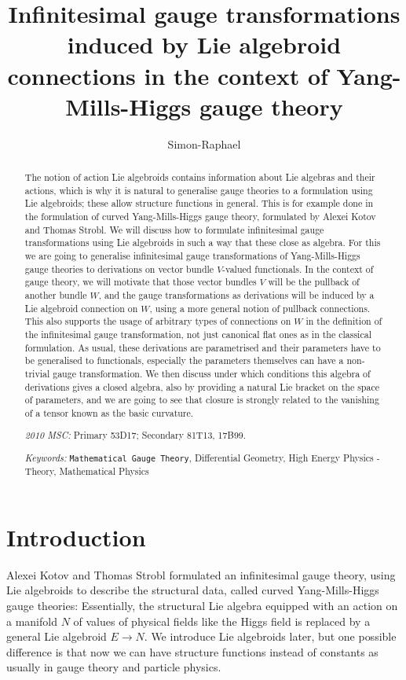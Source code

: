 \documentclass[CM,GP]{degruyter-crelle}       %
\title[Infinitesimal gauge transformations induced by Lie algebroid connections]{Infinitesimal gauge transformations induced by Lie algebroid connections in the context of Yang-Mills-Higgs gauge theory}
\author{Simon-Raphael}{Fischer}{}{Taipei}
\theoremstyle{plain}
\theoremstyle{remark}
\theoremstyle{definition}
\begin{document}
\begin{abstract}
The notion of action Lie algebroids contains information about Lie algebras and their actions, which is why it is natural to generalise gauge theories to a formulation using Lie algebroids; these allow structure functions in general. This is for example done in the formulation of curved Yang-Mills-Higgs gauge theory, formulated by Alexei Kotov and Thomas Strobl. We will discuss how to formulate infinitesimal gauge transformations using Lie algebroids in such a way that these close as algebra. For this we are going to generalise infinitesimal gauge transformations of Yang-Mills-Higgs gauge theories to derivations on vector bundle $V$-valued functionals. In the context of gauge theory, we will motivate that those vector bundles $V$ will be the pullback of another bundle $W$, and the gauge transformations as derivations will be induced by a Lie algebroid connection on $W$, using a more general notion of pullback connections. This also supports the usage of arbitrary types of connections on $W$ in the definition of the infinitesimal gauge transformation, not just canonical flat ones as in the classical formulation. As usual, these derivations are parametrised and their parameters have to be generalised to functionals, especially the parameters themselves can have a non-trivial gauge transformation. We then discuss under which conditions this algebra of derivations gives a closed algebra, also by providing a natural Lie bracket on the space of parameters, and we are going to see that closure is strongly related to the vanishing of a tensor known as the basic curvature.

\textit{2010 MSC:} Primary 53D17; Secondary 81T13, 17B99.

\textit{Keywords:} \texttt{Mathematical Gauge Theory}, Differential Geometry, High Energy Physics - Theory, Mathematical Physics
\end{abstract}



\section{Introduction}

Alexei Kotov and Thomas Strobl formulated an infinitesimal gauge theory, using Lie algebroids to describe the structural data, called curved Yang-Mills-Higgs gauge theories: Essentially, the structural Lie algebra equipped with an action on a manifold $N$ of values of physical fields like the Higgs field is replaced by a general Lie algebroid $E \to N$. We introduce Lie algebroids later, but one possible difference is that now we can have structure functions instead of constants as usually in gauge theory and particle physics.
\end{document}
